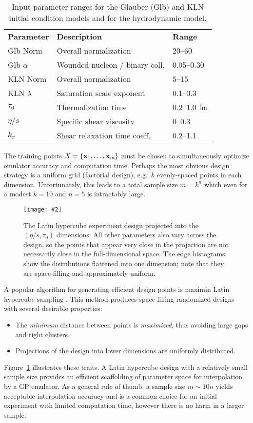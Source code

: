 \documentclass[aps,prc,reprint,superscriptaddress,amsmath]{revtex4-1}
\newcommand{\colfig}[3][t]{
  \begin{figure}[#1]
    \texttt{[image: \#2]}
    \caption{\label{fig:#2}#3}
  \end{figure}
}
\begin{document}
\begin{table}[b]
  \caption{
    \label{tab:design}
    Input parameter ranges for the Glauber (Glb) and KLN initial condition models and for the hydrodynamic model.
  }
  \begin{ruledtabular}
  \begin{tabular}{lll}
    \bf Parameter & \bf Description & \bf Range \\
    Glb Norm & Overall normalization & 20--60 \\
    Glb $\alpha$ & Wounded nucleon / binary coll. & 0.05--0.30 \\
    KLN Norm & Overall normalization & 5--15 \\
    KLN $\lambda$ & Saturation scale exponent & 0.1--0.3 \\
    $\tau_0$ & Thermalization time & 0.2--1.0 fm \\
    $\eta/s$ & Specific shear viscosity & 0--0.3 \\
    $k_\pi$ & Shear relaxation time coeff. & 0.2--1.1 \\
  \end{tabular}
  \end{ruledtabular}
\end{table}

The training points $X = \{\mathbf x_1, \ldots, \mathbf x_m\}$ must be chosen to simultaneously optimize emulator accuracy and computation time.
Perhaps the most obvious design strategy is a uniform grid (factorial design), e.g.\ $k$ evenly-spaced points in each dimension.
Unfortunately, this leads to a total sample size $m = k^n$ which even for a modest $k = 10$ and $n = 5$ is intractably large.

\colfig[t]{design}{
  The Latin hypercube experiment design projected into the $(\eta/s, \tau_0)$ dimensions.
  All other parameters also vary across the design, so the points that appear very close in the projection are not necessarily close in the full-dimensional space.
  The edge histograms show the distributions flattened into one dimension; note that they are space-filling and approximately uniform.
}

A popular algorithm for generating efficient design points is maximin Latin hypercube sampling \cite{Morris:1995lh}.
This method produces space-filling randomized designs with several desirable properties:
\begin{itemize}
  \item The \emph{minimum} distance between points is \emph{maximized}, thus avoiding large gaps and tight clusters.
  \item Projections of the design into lower dimensions are uniformly distributed.
\end{itemize}
Figure~\ref{fig:design} illustrates these traits.
A Latin hypercube design with a relatively small sample size provides an efficient scaffolding of parameter space for interpolation by a GP emulator.
As a general rule of thumb, a sample size $m \sim 10n$ yields acceptable interpolation accuracy \cite{Loeppky:2009ss} and is a common choice for an initial experiment with limited computation time, however there is no harm in a larger sample.
\end{document}
